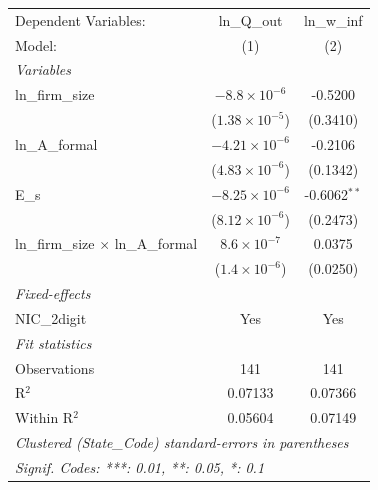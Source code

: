
\begingroup
\centering
\begin{tabular}{lcc}
   \tabularnewline \midrule \midrule
   Dependent Variables:                       & ln\_Q\_out              & ln\_w\_inf\\    
   Model:                                     & (1)                     & (2)\\  
   \midrule
   \emph{Variables}\\
   ln\_firm\_size                             & $-8.8\times 10^{-6}$    & -0.5200\\   
                                              & ($1.38\times 10^{-5}$)  & (0.3410)\\   
   ln\_A\_formal                              & $-4.21\times 10^{-6}$   & -0.2106\\   
                                              & ($4.83\times 10^{-6}$)  & (0.1342)\\   
   E\_s                                       & $-8.25\times 10^{-6}$   & -0.6062$^{**}$\\   
                                              & ($8.12\times 10^{-6}$)  & (0.2473)\\   
   ln\_firm\_size $\times$ ln\_A\_formal      & $8.6\times 10^{-7}$     & 0.0375\\   
                                              & ($1.4\times 10^{-6}$)   & (0.0250)\\   
   \midrule
   \emph{Fixed-effects}\\
   NIC\_2digit                                & Yes                     & Yes\\  
   \midrule
   \emph{Fit statistics}\\
   Observations                               & 141                     & 141\\  
   R$^2$                                      & 0.07133                 & 0.07366\\  
   Within R$^2$                               & 0.05604                 & 0.07149\\  
   \midrule \midrule
   \multicolumn{3}{l}{\emph{Clustered (State\_Code) standard-errors in parentheses}}\\
   \multicolumn{3}{l}{\emph{Signif. Codes: ***: 0.01, **: 0.05, *: 0.1}}\\
\end{tabular}
\par\endgroup


